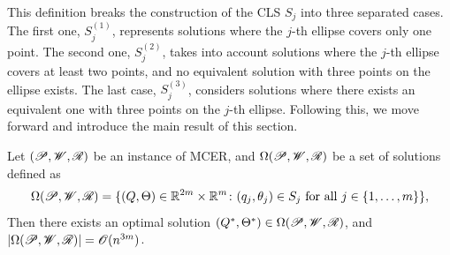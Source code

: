 This definition breaks the construction of the CLS $S_j$ into three separated cases. The first one, $S_j^{(1)}$, represents solutions where the $j$-th ellipse covers only one point. The second one, $S_j^{(2)}$, takes into account solutions where the $j$-th ellipse covers at least two points, and no equivalent solution with three points on the ellipse exists. The last case, $S_j^{(3)}$, considers solutions where there exists an equivalent one with three points on the $j$-th ellipse. Following this, we move forward and introduce the main result of this section. 

\begin{theorem}\label{th:mcer}
	Let $(\mathscr{P}, \mathscr{W}, \mathscr{R})$ be an instance of MCER, and $\Omega(\mathscr{P}, \mathscr{W}, \mathscr{R})$ be a set of solutions defined as 
	\begin{equation*}\label{eq:omega}
	\Omega(\mathscr{P}, \mathscr{W}, \mathscr{R}) = \{(Q, \Theta)\in \mathbb{R}^{2m}\times\mathbb{R}^m \colon (q_j, \theta_j) \in S_j \textnormal{ for all } j\in\{1, \dots, m\}\},
	\end{equation*}
Then there exists an optimal solution $(Q^*, \Theta^*) \in \Omega(\mathscr{P}, \mathscr{W}, \mathscr{R})$, and $|\Omega(\mathscr{P}, \mathscr{W}, \mathscr{R})|=\mathscr{O}(n^{3m})$.
\end{theorem}
